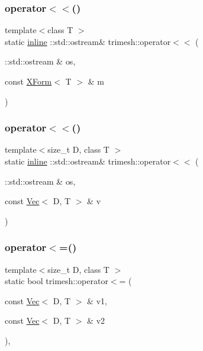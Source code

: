 \subsubsection{\texorpdfstring{operator$<$$<$()}{operator<<()}\hspace{0.1cm}{\footnotesize\ttfamily [1/2]}}
{\footnotesize\ttfamily template$<$class T $>$ \\
static \hyperlink{XForm_8h_a00d24c7231be28dbaf71f5408f30e44c}{inline} \+::std\+::ostream\& trimesh\+::operator$<$$<$ (\begin{DoxyParamCaption}\item[{\+::std\+::ostream \&}]{os,  }\item[{const \hyperlink{classtrimesh_1_1XForm}{X\+Form}$<$ T $>$ \&}]{m }\end{DoxyParamCaption})\hspace{0.3cm}{\ttfamily [static]}}

\mbox{\label{namespacetrimesh_a52735717a3893704a310000a5fee0269}} 
\subsubsection{\texorpdfstring{operator$<$$<$()}{operator<<()}\hspace{0.1cm}{\footnotesize\ttfamily [2/2]}}
{\footnotesize\ttfamily template$<$size\+\_\+t D, class T $>$ \\
static \hyperlink{XForm_8h_a00d24c7231be28dbaf71f5408f30e44c}{inline} \+::std\+::ostream\& trimesh\+::operator$<$$<$ (\begin{DoxyParamCaption}\item[{\+::std\+::ostream \&}]{os,  }\item[{const \hyperlink{classtrimesh_1_1Vec}{Vec}$<$ D, T $>$ \&}]{v }\end{DoxyParamCaption})\hspace{0.3cm}{\ttfamily [static]}}

\mbox{\label{namespacetrimesh_a324b25b5107102b7e40fef345224feb7}} 
\subsubsection{\texorpdfstring{operator$<$=()}{operator<=()}}
{\footnotesize\ttfamily template$<$size\+\_\+t D, class T $>$ \\
static bool trimesh\+::operator$<$= (\begin{DoxyParamCaption}\item[{const \hyperlink{classtrimesh_1_1Vec}{Vec}$<$ D, T $>$ \&}]{v1,  }\item[{const \hyperlink{classtrimesh_1_1Vec}{Vec}$<$ D, T $>$ \&}]{v2 }\end{DoxyParamCaption})\hspace{0.3cm}{\ttfamily [inline]}, {\ttfamily [static]}}

